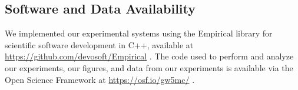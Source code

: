 \subsection{Software and Data Availability}

We implemented our experimental systems using the Empirical library for scientific software development in C++, available at \url{https://github.com/devosoft/Empirical} \citep{charles_ofria_2019_2575607}.
The code used to perform and analyze our experiments, our figures, and data from our experiments is available via the Open Science Framework at \url{https://osf.io/gw5mc/} \citep{foster2017open}.
